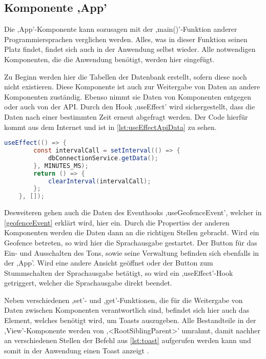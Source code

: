 \subsection{Komponente ,App'}
Die ,App'-Komponente kann sozusagen mit der ,main()'-Funktion anderer Programmiersprachen verglichen werden. Alles, was in dieser Funktion seinen Platz findet, findet sich auch in der Anwendung selbst wieder. Alle notwendigen Komponenten, die die Anwendung benötigt, werden hier eingefügt. 

Zu Beginn werden hier die Tabellen der Datenbank erstellt, sofern diese noch nicht existieren. Diese Komponente ist auch zur Weitergabe von Daten an andere Komponenten zuständig. Ebenso nimmt sie Daten von Komponenten entgegen oder auch von der API. Durch den Hook ,useEffect' wird sichergestellt, dass die Daten nach einer bestimmten Zeit erneut abgefragt werden. Der Code hierfür kommt aus dem Internet und ist in \autoref{lst:useEffectApiData} zu sehen.

\begin{lstlisting}[caption={In diesem ,useEffect'-Hook werden nach der Zeit, welche sich hinter der Variable ,MINUTES\_MS' verbirgt, die Daten der API abgerufen, was über die Funktion in Zeile 3 geschieht. (Quelle: \cite{useIntervalCode})},captionpos=b, language=Java, label=lst:useEffectApiData]
	useEffect(() => {
		const intervalCall = setInterval(() => {
			dbConnectionService.getData();
		}, MINUTES_MS);
		return () => {
			clearInterval(intervalCall);
		};
	}, []);
\end{lstlisting}

Desweiteren gehen auch die Daten des Eventhooks ,useGeofenceEvent', welcher in \autoref{geofenceEvent} erklärt wird, hier ein. Durch die Properties der anderen Komponenten werden die Daten dann an die richtigen Stellen gebracht. Wird ein Geofence betreten, so wird hier die Sprachausgabe gestartet. Der Button für das Ein- und Ausschalten des Tons, sowie seine Verwaltung befinden sich ebenfalls in der ,App'. Wird eine andere Ansicht geöffnet oder der Button zum Stummschalten der Sprachausgabe betätigt, so wird ein ,useEffect'-Hook getriggert, welcher die Sprachausgabe direkt beendet.

Neben verschiedenen ,set'- und ,get'-Funktionen, die für die Weitergabe von Daten zwischen Komponenten verantwortlich sind, befindet sich hier auch das Element, welches benötigt wird, um Toasts auszugeben. Alle Bestandteile in der ,View'-Komponente werden von ,<RootSiblingParent>' umrahmt, damit nachher an verschiedenen Stellen der Befehl aus \autoref{lst:toast} aufgerufen werden kann und somit in der Anwendung einen Toast anzeigt \cite{toastLibrary}.

